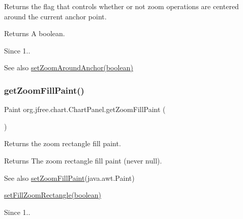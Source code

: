 Returns the flag that controls whether or not zoom operations are centered around the current anchor point.

\begin{DoxyReturn}{Returns}
A boolean.
\end{DoxyReturn}
\begin{DoxySince}{Since}
1..
\end{DoxySince}
\begin{DoxySeeAlso}{See also}
\mbox{\hyperlink{classorg_1_1jfree_1_1chart_1_1_chart_panel_a89fcf9fe09158f887a38f2cf4af15b42}{set\+Zoom\+Around\+Anchor(boolean)}} 
\end{DoxySeeAlso}
\mbox{\label{classorg_1_1jfree_1_1chart_1_1_chart_panel_aa67bc49f93e13a11fa4be9fcff4bead8}} 
\subsubsection{\texorpdfstring{get\+Zoom\+Fill\+Paint()}{getZoomFillPaint()}}
{\footnotesize\ttfamily Paint org.\+jfree.\+chart.\+Chart\+Panel.\+get\+Zoom\+Fill\+Paint (\begin{DoxyParamCaption}{ }\end{DoxyParamCaption})}

Returns the zoom rectangle fill paint.

\begin{DoxyReturn}{Returns}
The zoom rectangle fill paint (never {\ttfamily null}).
\end{DoxyReturn}
\begin{DoxySeeAlso}{See also}
\mbox{\hyperlink{classorg_1_1jfree_1_1chart_1_1_chart_panel_aacca6fbee6fa44be58e9b580b11c65f7}{set\+Zoom\+Fill\+Paint}}(java.\+awt.\+Paint) 

\mbox{\hyperlink{classorg_1_1jfree_1_1chart_1_1_chart_panel_a3ada07f651391e5e81f9505e202f64cc}{set\+Fill\+Zoom\+Rectangle(boolean)}}
\end{DoxySeeAlso}
\begin{DoxySince}{Since}
1.. 
\end{DoxySince}
\mbox{\label{classorg_1_1jfree_1_1chart_1_1_chart_panel_a43dfc4192b55821224ea51b414f7494c}} 
